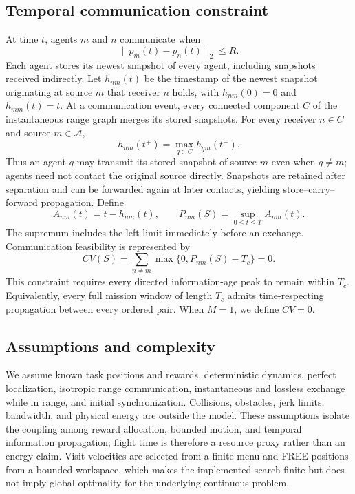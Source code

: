 \subsection{Temporal communication constraint}
At time $t$, agents $m$ and $n$ communicate when
\begin{equation}
 \|p_m(t)-p_n(t)\|_2\le R.
 \label{eq:contact}
\end{equation}
Each agent stores its newest snapshot of every agent, including snapshots received indirectly. Let $h_{nm}(t)$ be the timestamp of the newest snapshot originating at source $m$ that receiver $n$ holds, with $h_{nm}(0)=0$ and $h_{mm}(t)=t$. At a communication event, every connected component $C$ of the instantaneous range graph merges its stored snapshots. For every receiver $n\in C$ and source $m\in\mathcal A$,
\begin{equation}
 h_{nm}(t^+)=\max_{q\in C}h_{qm}(t^-).
 \label{eq:snapshot_exchange}
\end{equation}
Thus an agent $q$ may transmit its stored snapshot of source $m$ even when $q\ne m$; agents need not contact the original source directly. Snapshots are retained after separation and can be forwarded again at later contacts, yielding store--carry--forward propagation. Define
\begin{equation}
 A_{nm}(t)=t-h_{nm}(t),\qquad
 P_{nm}(S)=\sup_{0\le t\le T} A_{nm}(t).
 \label{eq:staleness}
\end{equation}
The supremum includes the left limit immediately before an exchange. Communication feasibility is represented by
\begin{equation}
 CV(S)=\sum_{n\ne m}\max\{0,P_{nm}(S)-T_c\}=0.
 \label{eq:communication_constraint}
\end{equation}
This constraint requires every directed information-age peak to remain within $T_c$. Equivalently, every full mission window of length $T_c$ admits time-respecting propagation between every ordered pair. When $M=1$, we define $CV=0$.

\subsection{Assumptions and complexity}
We assume known task positions and rewards, deterministic dynamics, perfect localization, isotropic range communication, instantaneous and lossless exchange while in range, and initial synchronization. Collisions, obstacles, jerk limits, bandwidth, and physical energy are outside the model. These assumptions isolate the coupling among reward allocation, bounded motion, and temporal information propagation; flight time is therefore a resource proxy rather than an energy claim. Visit velocities are selected from a finite menu and FREE positions from a bounded workspace, which makes the implemented search finite but does not imply global optimality for the underlying continuous problem.

